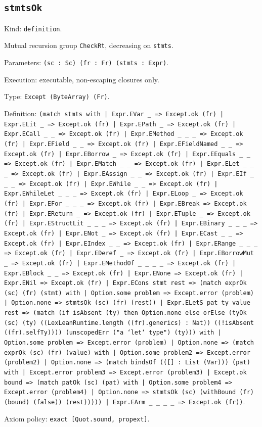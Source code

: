 \documentclass[11pt]{article}
\begin{document}
\subsection*{\texttt{stmtsOk}}
\noindent Kind: \texttt{definition}.\par
\noindent Mutual recursion group \texttt{CheckRt}, decreasing on \texttt{stmts}.\par
\noindent Parameters: \texttt{(sc : Sc) (fr : Fr) (stmts : Expr)}.\par
\noindent Execution: executable, non-escaping closures only.\par
\noindent Type: \texttt{Except (ByteArray) (Fr)}.\par
\noindent Definition: \texttt{(match stmts with | Expr.EVar \_ => Except.ok (fr) | Expr.ELit \_ => Except.ok (fr) | Expr.EPath \_ => Except.ok (fr) | Expr.ECall \_ \_ => Except.ok (fr) | Expr.EMethod \_ \_ \_ => Except.ok (fr) | Expr.EField \_ \_ => Except.ok (fr) | Expr.EFieldNamed \_ \_ => Except.ok (fr) | Expr.EBorrow \_ => Except.ok (fr) | Expr.EEquals \_ \_ => Except.ok (fr) | Expr.EMatch \_ \_ => Except.ok (fr) | Expr.ELet \_ \_ \_ => Except.ok (fr) | Expr.EAssign \_ \_ => Except.ok (fr) | Expr.EIf \_ \_ \_ => Except.ok (fr) | Expr.EWhile \_ \_ => Except.ok (fr) | Expr.EWhileLet \_ \_ \_ => Except.ok (fr) | Expr.ELoop \_ => Except.ok (fr) | Expr.EFor \_ \_ \_ => Except.ok (fr) | Expr.EBreak => Except.ok (fr) | Expr.EReturn \_ => Except.ok (fr) | Expr.ETuple \_ => Except.ok (fr) | Expr.EStructLit \_ \_ \_ => Except.ok (fr) | Expr.EBinary \_ \_ \_ => Except.ok (fr) | Expr.ENot \_ => Except.ok (fr) | Expr.ECast \_ \_ => Except.ok (fr) | Expr.EIndex \_ \_ => Except.ok (fr) | Expr.ERange \_ \_ \_ => Except.ok (fr) | Expr.EDeref \_ => Except.ok (fr) | Expr.EBorrowMut \_ => Except.ok (fr) | Expr.EMethodOf \_ \_ \_ \_ => Except.ok (fr) | Expr.EBlock \_ \_ => Except.ok (fr) | Expr.ENone => Except.ok (fr) | Expr.ENil => Except.ok (fr) | Expr.ECons stmt rest => (match exprOk (sc) (fr) (stmt) with | Option.some problem => Except.error (problem) | Option.none => stmtsOk (sc) (fr) (rest)) | Expr.ELetS pat ty value rest => (match (if isAbsent (ty) then Option.none else orElse (tyOk (sc) (ty) ((LexLeanRuntime.length ((fr).generics) : Nat)) ((!isAbsent ((fr).selfTy)))) (unscopedErr ("a `let` type") (ty))) with | Option.some problem => Except.error (problem) | Option.none => (match exprOk (sc) (fr) (value) with | Option.some problem2 => Except.error (problem2) | Option.none => (match bindsOf (([] : List (Var))) (pat) with | Except.error problem3 => Except.error (problem3) | Except.ok bound => (match patOk (sc) (pat) with | Option.some problem4 => Except.error (problem4) | Option.none => stmtsOk (sc) (withBound (fr) (bound) (false)) (rest))))) | Expr.EArm \_ \_ \_ \_ => Except.ok (fr))}.\par
\noindent Axiom policy: \texttt{exact [Quot.sound, propext]}.\par
\end{document}
